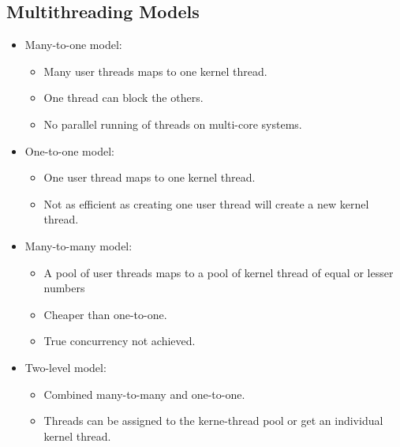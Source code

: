 \documentclass[a4wide,10pt]{article}
\begin{document}
\subsection{Multithreading Models} %
\label{sub:multithreading_models}
\begin{itemize}
	\item Many-to-one model:
	\begin{itemize}
		\item Many user threads maps to one kernel thread.
		\item One thread can block the others.
		\item No parallel running of threads on multi-core systems.
	\end{itemize}
	\item One-to-one model:
	\begin{itemize}
		\item One user thread maps to one kernel thread.
		\item Not as efficient as creating one user thread will create a new kernel thread.
	\end{itemize}
	\item Many-to-many model:
	\begin{itemize}
		\item A pool of user threads maps to a pool of kernel thread of equal or lesser numbers
		\item Cheaper than one-to-one.
		\item True concurrency not achieved.
	\end{itemize}
	\item Two-level model:
	\begin{itemize}
		\item Combined many-to-many and one-to-one.
		\item Threads can be assigned to the kerne-thread pool or get an individual kernel thread.
	\end{itemize}
\end{itemize}
\addtocounter{subsection}{1}
\end{document}
